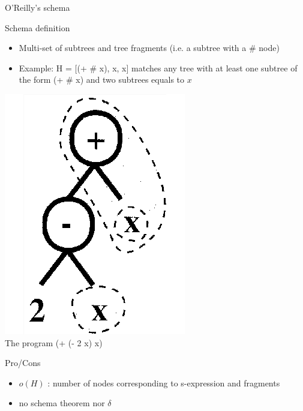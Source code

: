 \begin{frame}{O'Reilly's schema}
  \begin{block}{Schema definition}
    \begin{itemize}
      \item Multi-set of subtrees and tree fragments (i.e. a subtree with a \# node)\cite{oreilly1994}
      \item Example: H = [(+ \# x), x, x] matches any tree with at least one subtree of the form (+ \# x) and two subtrees equals to $x$
    \end{itemize}
  \end{block}

  \begin{center}
    \includegraphics[scale=0.90]{img/schemar}\\
    The program (+ (- 2 x) x)
  \end{center}

    \begin{block}{Pro/Cons}
      \begin{itemize}
        \item<pro@1> $o(H)$ : number of nodes corresponding to s-expression and fragments
        \item<con@1> no schema theorem nor $\delta$
      \end{itemize}
    \end{block}
\end{frame}


